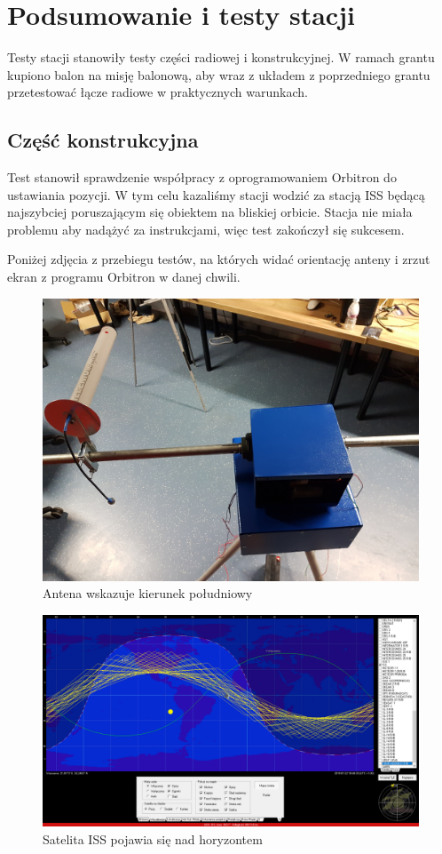 \section{Podsumowanie i testy stacji}

Testy stacji stanowiły testy części radiowej i konstrukcyjnej. W ramach grantu kupiono balon na misję balonową, aby wraz z układem z poprzedniego grantu przetestować łącze radiowe w praktycznych warunkach.

\subsection{Część konstrukcyjna}

Test stanowił sprawdzenie współpracy z oprogramowaniem Orbitron do ustawiania pozycji. W tym celu kazaliśmy stacji wodzić za stacją ISS będącą najszybciej poruszającym się obiektem na bliskiej orbicie. Stacja nie miała problemu aby nadążyć za instrukcjami, więc test zakończył się sukcesem.



Poniżej zdjęcia z przebiegu testów, na których widać orientację anteny i zrzut ekran z programu Orbitron w danej chwili.

\begin{figure}[h]
	\centering
		\includegraphics[width=0.7 \textwidth]{testy/antenaS}
	\caption{Antena wskazuje kierunek południowy}	
	\label{fig:antenaS}
\end{figure}

\begin{figure}[h]
	\centering
		\includegraphics[width=0.7 \textwidth]{testy/pojawia}
	\caption{Satelita ISS pojawia się nad horyzontem}	
	\label{fig:pojawia}
\end{figure}

